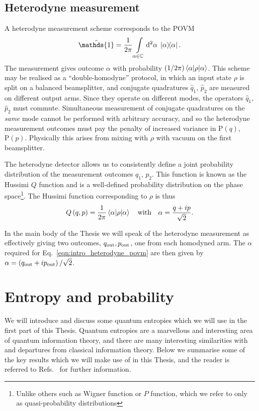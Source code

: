\FloatBarrier
\subsection{Heterodyne measurement}
A heterodyne measurement scheme corresponds to the POVM
\begin{equation}\label{eqn:intro_heterodyne_povm}
\hat{\mathds{1}} = \frac{1}{2\pi} \int\limits_{\alpha \in \mathbb{C}} \Diff2 \alpha \; \dyad{\alpha}.
\end{equation}
The measurement gives outcome $\alpha$ with probability $(1/2\pi)\ev{\rho}{\alpha}$. This scheme may be realised as a ``double-homodyne'' protocol, in which an input state $\rho$ is split on a balanced beamsplitter, and conjugate quadratures $\hat{q}_1$, $\hat{p}_2$ are measured on different output arms. Since they operate on different modes, the operators $\hat{q}_1$, $\hat{p}_2$ must commute. Simultaneous measurement of conjugate quadratures on the \emph{same} mode cannot be performed with arbitrary accuracy, and so the heterodyne measurement outcomes must pay the penalty of increased variance in $\text{P}\left(q\right)$, $\text{P}\left(p\right)$. Physically this arises from mixing with $\rho$ with vacuum on the first beamsplitter.


The heterodyne detector allows us to consistently define a joint probability distribution of the measurement outcomes $q_1$, $p_2$. This function is known as the Hussimi $Q$ function and is a well-defined probability distribution on the phase space\footnote{Unlike others such as Wigner function or $P$ function, which we refer to only as quasi-probability distributions}. The Hussimi function corresponding to $\rho$ is thus
\begin{equation}
Q\left(q, p\right) = \frac{1}{2\pi} \ev{\rho}{\alpha} \qq{with} \alpha = \frac{q + i p}{\sqrt{2}}.
\end{equation}

\noindent In the main body of the Thesis we will speak of the heterodyne measurement as effectively giving two outcomes, $q_{\text{out}}, p_{\text{out}}$, one from each homodyned arm. The $\alpha$ required for Eq.~\ref{eqn:intro_heterodyne_povm} are then given by $\alpha = \left(q_{\text{out}} + i p_{\text{out}}\right)/\sqrt{2}$.





\FloatBarrier
\section{Entropy and probability}
We will introduce and discuss some quantum entropies which we will use in the first part of this Thesis. Quantum entropies are a marvellous and interesting area of quantum information theory, and there are many interesting similarities with and departures from classical information theory. Below we summarise some of the key results which we will make use of in this Thesis, and the reader is referred to Refs.~\cite{Nielsen2010, Tomamichel2016, Wilde2015, Watrous2019} for further information.




